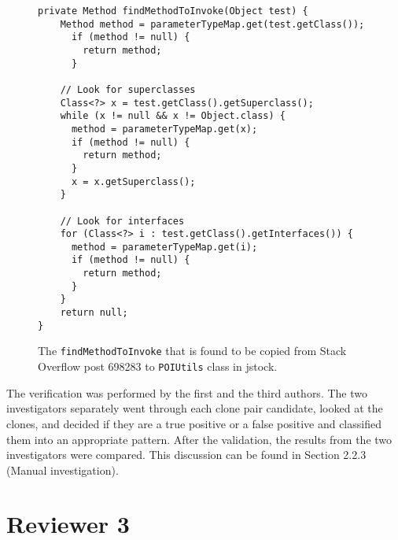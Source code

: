 \documentclass[a4paper,twoside,10pt]{reviewresponse}
\begin{document}
\begin{figure}[H]
	\begin{lstlisting}
private Method findMethodToInvoke(Object test) {
	Method method = parameterTypeMap.get(test.getClass());
	  if (method != null) {
	    return method;
	  }
	
	// Look for superclasses
	Class<?> x = test.getClass().getSuperclass();
	while (x != null && x != Object.class) {
	  method = parameterTypeMap.get(x);
	  if (method != null) {
	    return method;
	  }
	  x = x.getSuperclass();
	}
	
	// Look for interfaces
	for (Class<?> i : test.getClass().getInterfaces()) {
	  method = parameterTypeMap.get(i);
	  if (method != null) {
	    return method;
	  }
	}
	return null;
}
	\end{lstlisting}
	\caption{The {\small\texttt{findMethodToInvoke}} that is found to be copied from Stack Overflow post 698283 to {\small\texttt{POIUtils}} class in \textsf{jstock}.}
	\label{fig:jstock_code}
\end{figure}

The verification was performed by the first and
the third authors. The two investigators separately went through each clone pair
candidate, looked at the clones, and decided if they are a true positive or a
false positive and classified them into an appropriate pattern. After the
validation, the results from the two investigators were compared. 
This discussion can be found in Section 2.2.3 (Manual investigation).

\section{Reviewer 3}

\end{document}
